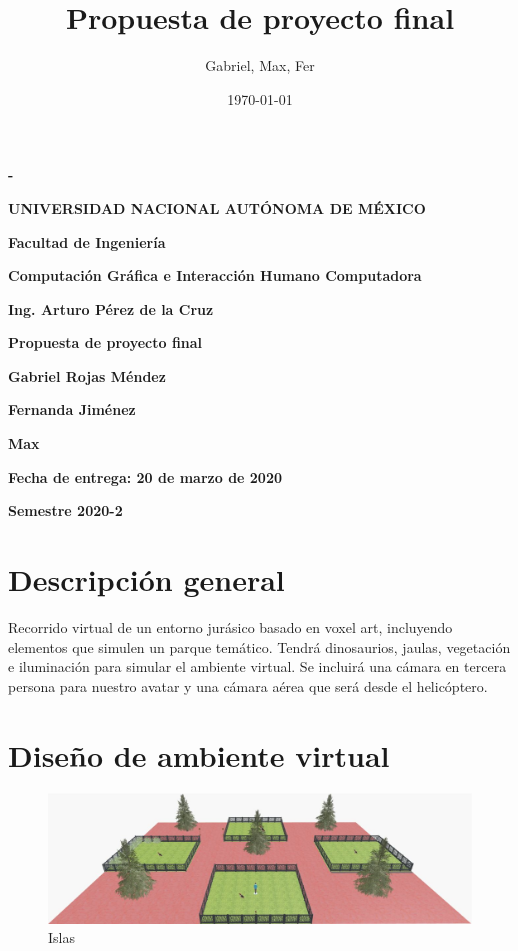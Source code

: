 \documentclass[12pt]{article} %
\title{Propuesta de proyecto final}
\author{Gabriel, Max, Fer}
\date{\today}
\begin{document}
	\begin{titlepage}
		\thispagestyle{fancy}
		\centering
		{\bfseries - \par}
		\vspace{1cm}
		{\bfseries\LARGE UNIVERSIDAD NACIONAL AUTÓNOMA DE MÉXICO \par}
		\vspace{1cm}
		{\bfseries\LARGE Facultad de Ingeniería \par}
		\vspace{1cm}
		{\bfseries\LARGE Computación Gráfica e Interacción Humano Computadora \par}
		\vspace{1cm}
		{\bfseries\LARGE Ing. Arturo Pérez de la Cruz \par}
		\vspace{1cm}
		{\bfseries\LARGE Propuesta de proyecto final \par}
		\vspace{1cm}
		{\bfseries\LARGE Gabriel Rojas Méndez \par}
		{\bfseries\LARGE Fernanda Jiménez \par}
		{\bfseries\LARGE Max \par}
		\vspace{1cm}
		{\bfseries\LARGE Fecha de entrega: 20 de marzo de 2020 \par}
		\vspace{1cm}
		{\bfseries\LARGE Semestre 2020-2 \par}
	\end{titlepage}
	
	
	\newpage
	
	\section{Descripción general}
	
	\setlength{\parindent}{1.0cm}
	Recorrido virtual de un entorno jurásico basado en voxel art, incluyendo elementos que simulen un parque temático. 
	Tendrá dinosaurios, jaulas, vegetación e iluminación para simular el ambiente virtual. 
	Se incluirá una cámara en tercera persona para nuestro avatar y una cámara aérea que será desde el helicóptero.
	\setlength{\parindent}{0.0cm}
	
	\section{Diseño de ambiente virtual}
	
	\begin{figure}[h]
		\begin{center}
			\includegraphics[scale=0.485]{images/Propuesta3D.jpg}
			\caption{Islas}
		\end{center}  		
	\end{figure}
	
\end{document}
